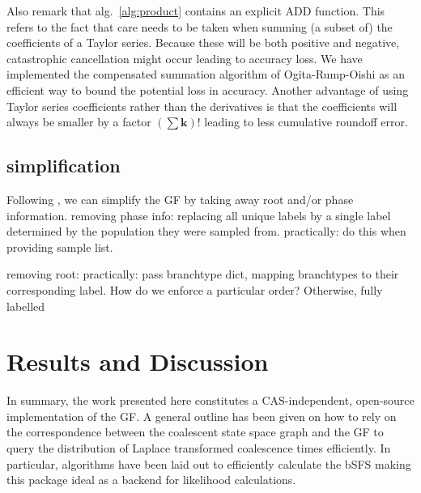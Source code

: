 \documentclass[10pt, a4]{article}
\begin{document}
Also remark that alg.\ \ref{alg:product} contains an explicit ADD function. This refers to the fact that care needs to be taken when summing (a subset of) the coefficients of a Taylor series. Because these will be both positive and negative, catastrophic cancellation might occur leading to accuracy loss. We have implemented the compensated summation algorithm of Ogita-Rump-Oishi \citep{Ogita2005} as an efficient way to bound the potential loss in accuracy. %
Another advantage of using Taylor series coefficients rather than the derivatives is that the coefficients will always be smaller by a factor $(\sum \boldsymbol{k})!$ leading to less cumulative roundoff error.


\subsection{simplification}

Following \citet{Lohse2016}, we can simplify the GF by taking away root and/or phase information.
removing phase info: replacing all unique labels by a single label determined by the population they were sampled from.
practically: do this when providing sample list.

removing root: 
practically: pass branchtype dict, mapping branchtypes to their corresponding label. How do we enforce a particular order?
Otherwise, fully labelled 


\section{Results and Discussion}

%
In summary, the work presented here constitutes a CAS-independent, open-source implementation of the GF. A general outline has been given on how to rely on the correspondence between the coalescent state space graph and the GF to query the distribution of Laplace transformed coalescence times efficiently. In particular, algorithms have been laid out to efficiently calculate the bSFS making this package ideal as a backend for likelihood calculations.
\end{document}
